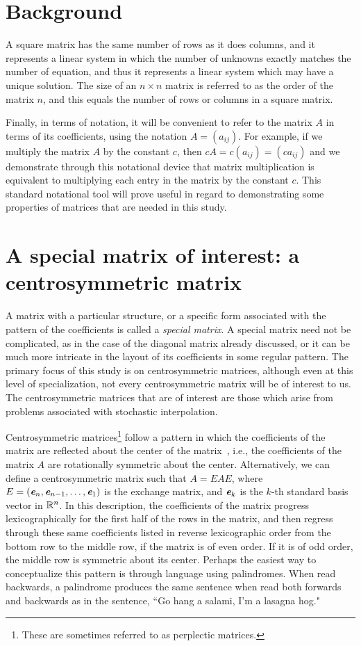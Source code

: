 \section{Background}

A square matrix
has the same number of rows as it does
columns, and it represents a linear system in which the number
of unknowns exactly matches the number of equation, and thus it represents
a linear system which may have a unique solution.
The size of an $n\times n$  matrix is referred
to as the order of the matrix $n$, and
this equals the number of rows
or columns
in a square matrix.

Finally, in terms of notation, it will be convenient to refer to the
matrix $A$ in terms of its coefficients, using the notation $A = (a_{ij})$.
For example, if we multiply the matrix $A$ by the constant $c$, then
$c A = c (a_{ij}) = (c a_{ij})$ and we demonstrate through this notational
device that matrix  multiplication
is equivalent to multiplying each entry in the matrix by the constant $c$.
This standard notational tool will prove useful in regard to demonstrating some
properties of matrices that are needed in this study.

\section{A special matrix of interest: a centrosymmetric matrix}

A matrix with a particular structure, or a specific form  associated
with the pattern of the coefficients is called a
\textit{special matrix}.
A special matrix
need not be complicated, as in
the case of the  diagonal matrix already discussed,  or it can be much more
intricate in the layout of its coefficients in some regular pattern.
The primary focus of this study is on centrosymmetric  matrices,
although even at this level of specialization,
not every centrosymmetric matrix will be of interest to us.
The centrosymmetric matrices that are of interest are those
which arise from problems associated with stochastic interpolation.

Centrosymmetric matrices\footnote{These are sometimes referred to as perplectic matrices.}
follow a pattern in which the coefficients of the matrix are reflected about
the center of the matrix~\cite{brookes}, i.e.,
the coefficients of the matrix $A$ are rotationally symmetric
about the center. Alternatively, we can define a centrosymmetric
matrix such that  $A = EAE$,
where $E = (\textbf{\em e}_n, \textbf{\em e}_{n-1}, \ldots, \textbf{\em e}_1)$ is the exchange matrix, and $\textbf{\em e}_k$ is the $k$-th standard basis vector in $\mathbb{R}^n$.
In this description, the coefficients of the matrix
progress lexicographically for the
first half of the rows in the matrix,
and then regress through these same coefficients listed in
reverse lexicographic order from the bottom row to the middle row,
if the matrix is of even order. If it is of odd order, the middle row
is symmetric about its center.
Perhaps the easiest way to conceptualize this pattern is through language
using palindromes.
When read backwards, a palindrome produces the same sentence when read both
forwards and backwards as in the sentence, ``Go hang a salami, I'm a lasagna hog."


